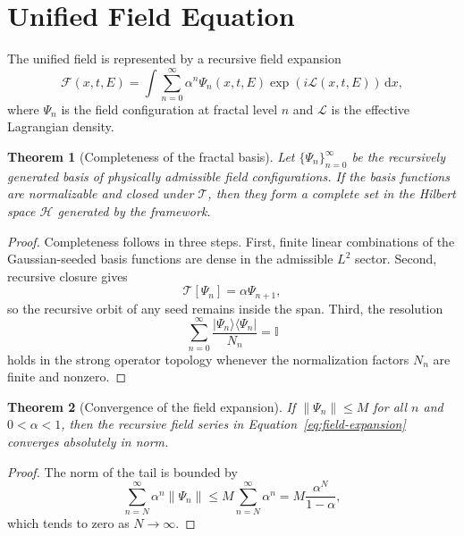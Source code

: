 \documentclass[12pt]{article}
\newtheorem{theorem}{Theorem}[section]
\theoremstyle{remark}
\newcommand{\F}{\mathcal{F}}
\newcommand{\T}{\mathcal{T}}
\newcommand{\Lag}{\mathcal{L}}
\newcommand{\dd}{\mathrm{d}}
\newcommand{\norm}[1]{\left\lVert #1 \right\rVert}
\begin{document}
\section{Unified Field Equation}

The unified field is represented by a recursive field expansion
\begin{equation}
  \F(x,t,E)=
  \int \sum_{n=0}^{\infty}
  \alpha^n\Psi_n(x,t,E)
  \exp\!\left(i\Lag(x,t,E)\right)\,\dd x,
  \label{eq:field-expansion}
\end{equation}
where $\Psi_n$ is the field configuration at fractal level $n$ and $\Lag$ is
the effective Lagrangian density.

\begin{theorem}[Completeness of the fractal basis]
Let $\{\Psi_n\}_{n=0}^{\infty}$ be the recursively generated basis of physically
admissible field configurations.  If the basis functions are normalizable and
closed under $\T$, then they form a complete set in the Hilbert space
$\mathcal{H}$ generated by the framework.
\end{theorem}

\begin{proof}
Completeness follows in three steps.  First, finite linear combinations of the
Gaussian-seeded basis functions are dense in the admissible $L^2$ sector.
Second, recursive closure gives
\begin{equation}
  \T[\Psi_n]=\alpha\Psi_{n+1},
\end{equation}
so the recursive orbit of any seed remains inside the span.  Third, the
resolution
\begin{equation}
  \sum_{n=0}^{\infty}\frac{|\Psi_n\rangle\langle\Psi_n|}{N_n}
  =\mathbb{I}
\end{equation}
holds in the strong operator topology whenever the normalization factors $N_n$
are finite and nonzero.
\end{proof}

\begin{theorem}[Convergence of the field expansion]
If $\norm{\Psi_n}\leq M$ for all $n$ and $0<\alpha<1$, then the recursive field
series in Equation~\eqref{eq:field-expansion} converges absolutely in norm.
\end{theorem}

\begin{proof}
The norm of the tail is bounded by
\begin{equation}
  \sum_{n=N}^{\infty}\alpha^n\norm{\Psi_n}
  \leq M\sum_{n=N}^{\infty}\alpha^n
  = M\frac{\alpha^N}{1-\alpha},
\end{equation}
which tends to zero as $N\to\infty$.
\end{proof}
\end{document}
